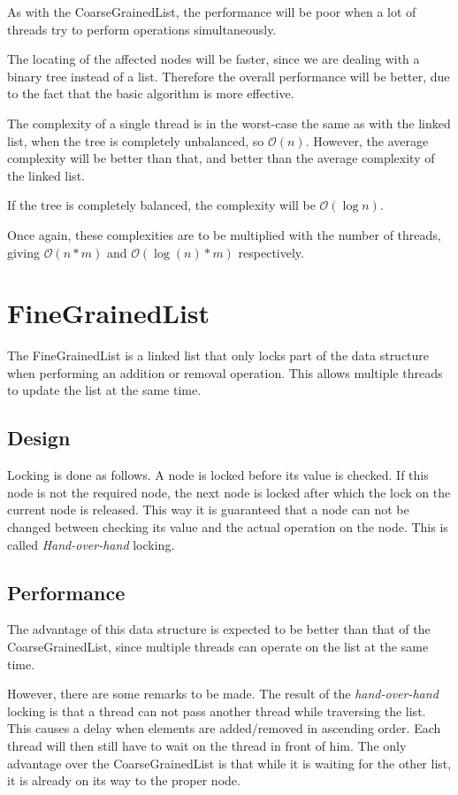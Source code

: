 \documentclass[a4paper]{article}
\def\bigoh{\mathcal{O}}
\begin{document}
As with the CoarseGrainedList, the performance will be poor when a lot of
threads try to perform operations simultaneously.

The locating of the affected nodes will be faster, since we are dealing
with a binary tree instead of a list. Therefore the overall performance
will be better, due to the fact that the basic algorithm is more effective.

The complexity of a single thread is in the worst-case the same as with the
linked list, when the tree is completely unbalanced, so $\bigoh(n)$.
However, the average complexity will be better than that, and better than the
average complexity of the linked list.

If the tree is completely balanced, the complexity will be
$\bigoh(\log n)$.

Once again, these complexities are to be multiplied with the number of
threads, giving $\bigoh(n * m)$ and $\bigoh(\log(n) * m)$
respectively.

\section{FineGrainedList}

The FineGrainedList is a linked list that only locks part of the data
structure when performing an addition or removal operation. This allows
multiple threads to update the list at the same time.

\subsection{Design}

Locking is done as follows. A node is locked before its value is checked.
If this node is not the required node, the next node is locked after which the
lock on the current node is released. This way it is guaranteed that a node
can not be changed between checking its value and the actual operation on the
node. This is called \emph{Hand-over-hand} locking.

\subsection{Performance}

The advantage of this data structure is expected to be better than that of the
CoarseGrainedList, since multiple threads can operate on the list at the same
time.

However, there are some remarks to be made. The result of the 
\emph{hand-over-hand} locking is that a thread can not pass another thread
while traversing the list. This causes a delay when elements are added/removed
in ascending order. Each thread will then still have to wait on the thread in
front of him. The only advantage over the CoarseGrainedList is that while
it is waiting for the other list, it is already on its way to the proper node.
\end{document}
